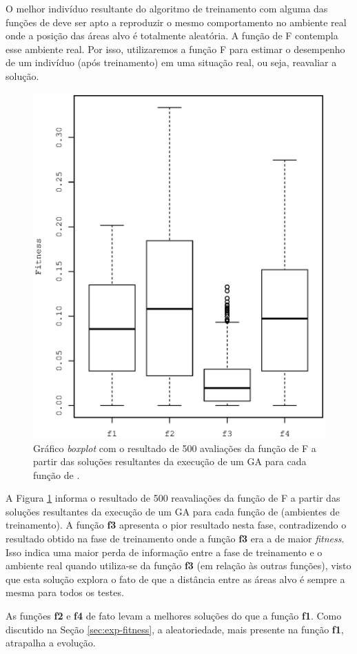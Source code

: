 O melhor indivíduo resultante do algoritmo de treinamento com alguma das funções de \fitness deve ser apto a reproduzir o mesmo comportamento no ambiente real onde a posição das áreas alvo é totalmente aleatória. A função de \fitness F contempla esse ambiente real. Por isso, utilizaremos a função F para estimar o desempenho de um indivíduo (após treinamento) em uma situação real, ou seja, reavaliar a solução.

\begin{figure}[h]
    \centering
    \includegraphics[width=.4\textwidth]{figures/reeval}
    \caption{Gráfico \textit{boxplot} com o resultado de 500 avaliações da função de \fitness F a partir das soluções resultantes da execução de um GA para cada função de \fitness.}
    \label{fig:reeval}
\end{figure}

A Figura \ref{fig:reeval} informa o resultado de 500 reavaliações da função de \fitness F a partir das soluções resultantes da execução de um GA para cada função de \fitness (ambientes de treinamento). A função \textbf{f3} apresenta o pior resultado nesta fase, contradizendo o resultado obtido na fase de treinamento onde a função \textbf{f3} era a de maior \textit{fitness}. Isso indica uma maior perda de informação entre a fase de treinamento e o ambiente real quando utiliza-se da função \textbf{f3} (em relação às outras funções), visto que esta solução explora o fato de que a distância entre as áreas alvo é sempre a mesma para todos os testes.

As funções \textbf{f2} e \textbf{f4} de fato levam a melhores soluções do que a função \textbf{f1}. Como discutido na Seção \ref{sec:exp-fitness}, a aleatoriedade, mais presente na função \textbf{f1}, atrapalha a evolução.


\pagebreak

